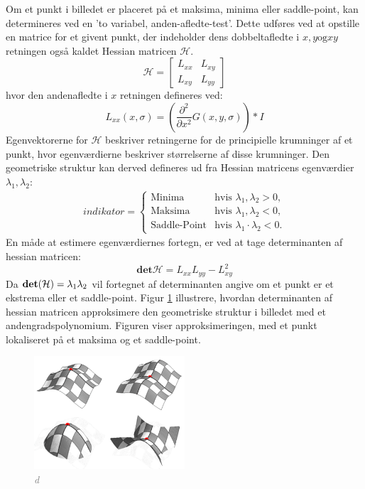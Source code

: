 Om et punkt i billedet er placeret på et maksima, minima eller saddle-point, kan determineres ved en 'to variabel, anden-afledte-test'. Dette udføres ved at opstille en matrice for et givent punkt, der indeholder dens dobbeltafledte i $x, y \text{og} xy$ retningen også kaldet Hessian matricen $\mathcal{H}$.
\begin{equation}
\mathcal{H} = 
 \begin{bmatrix}
 	L_{xx} & L_{xy} \\
 	L_{xy} & L_{yy}
 \end{bmatrix}
 \label{hessianmatrixblob}
\end{equation}
hvor den andenafledte i $x$ retningen defineres ved:
\begin{equation}
L_{xx}(x, \sigma) = (\frac{\partial^2 }{\partial x^2 } G(x,y,\sigma)) * I
\label{lxx}
\end{equation}
Egenvektorerne for $\mathcal{H}$ beskriver retningerne for de principielle krumninger af et punkt, hvor egenværdierne beskriver størrelserne af disse krumninger. Den geometriske struktur kan derved defineres ud fra Hessian matricens egenværdier $\lambda_1, \lambda_2$:
\begin{equation}
\begin{split}
indikator = 
\begin{cases}
\text{Minima} & \text{hvis } \lambda_1, \lambda_2 > 0, \\
\text{Maksima}& \text{hvis } \lambda_1, \lambda_2 < 0,  \\
\text{Saddle-Point} & \text{hvis } \lambda_1 \cdot \lambda_2 < 0.
\end{cases}
\end{split}
\label{maxsurp}
\end{equation}
En måde at estimere egenværdiernes fortegn, er ved at tage determinanten af hessian matricen:
\begin{equation}
\textbf{det}\mathcal{H} = L_{xx}L_{yy}-L_{xy}^2
\label{detofhessian}
\end{equation}
Da $\bold{det}(\mathcal{H})=\lambda_1 \lambda_2$ vil fortegnet af determinanten angive om et punkt er et ekstrema eller et saddle-point. Figur \ref{fig:makssad} illustrere, hvordan determinanten af hessian matricen approksimere den geometriske struktur i billedet med et andengradspolynomium. Figuren viser approksimeringen, med et punkt lokaliseret på et maksima og et saddle-point.
\begin{figure}[H]
    \centering
    \includegraphics[width=0.50\textwidth]{fig/41.png}
    \vspace{-0.5em}
    \begin{center}
    \caption{\textcolor{gray}{\footnotesize \textit{
d   }}}
    \label{fig:makssad}
     \end{center}
  \end{figure}
